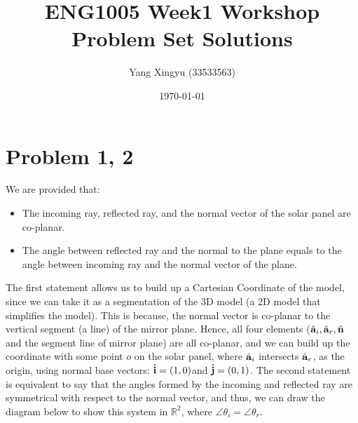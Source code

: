 \documentclass[12pt,a4paper]{article}
\begin{document}
\title{ENG1005 Week1 Workshop Problem Set Solutions}
\author{Yang Xingyu (33533563)}
\date{\today}
\maketitle

\section*{Problem 1, 2}
\begin{solution}
We are provided that:
\begin{itemize}
    \item The incoming ray, reflected ray, and the normal vector of the solar panel are co-planar.
    \item The angle between reflected ray and the normal to the plane equals to the angle between incoming ray and the normal vector of the plane.
\end{itemize}
The first statement allows us to build up a Cartesian Coordinate of the model, since we can take it as a segmentation of the 3D model (a 2D model that simplifies the model). This is because, the normal vector is co-planar to the vertical segment (a line) of the mirror plane. Hence, all four elements ($\hat{\mathbf{a}}_i,\hat{\mathbf{a}}_r, \hat{\mathbf{n}}$ and the segment line of mirror plane) are all co-planar, and we can build up the coordinate with some point $o$ on the solar panel, where $\hat{\mathbf{a}}_i$ intersects $\hat{\mathbf{a}}_r$, as the origin, using normal base vectors: $\hat{\mathbf{i}} = (1,0)$and $\hat{\mathbf{j}} = (0,1)$.
The second statement is equivalent to say that the angles formed by the incoming and reflected ray are symmetrical with respect to the normal vector, and thus, we can draw the diagram below to show this system in $\mathbb{R}^2$, where $\angle \theta_i = \angle \theta_r$.
\begin{figure}[H]
    \centering
\end{figure}
\end{solution}
\end{document}
